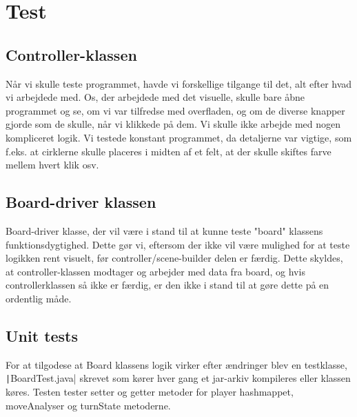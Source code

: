 \section{Test}
\subsection{Controller-klassen}\label{CKT}
Når vi skulle teste programmet, havde vi forskellige tilgange til det, alt efter hvad vi arbejdede med. Os, der arbejdede med det visuelle, skulle bare åbne programmet og se, om vi var tilfredse med overfladen, og om de diverse knapper gjorde som de skulle, når vi klikkede på dem. Vi skulle ikke arbejde med nogen kompliceret logik. Vi testede konstant programmet, da detaljerne var vigtige, som f.eks. at cirklerne skulle placeres i midten af et felt, at der skulle skiftes farve mellem hvert klik osv. 
\subsection{Board-driver klassen}\label{BDKT}
Board-driver klasse, der vil være i stand til at kunne teste "board" klassens funktionsdygtighed. Dette gør vi, eftersom der ikke vil være mulighed for at teste logikken rent visuelt, før controller/scene-builder delen er færdig. Dette skyldes, at controller-klassen modtager og arbejder med data fra board, og hvis controllerklassen så ikke er færdig, er den ikke i stand til at gøre dette på en ordentlig måde.
\subsection{Unit tests}\label{sec:unitTests}
For at tilgodese at Board klassens logik virker efter ændringer blev en testklasse, \texttt|BoardTest.java| skrevet som kører hver gang et jar-arkiv kompileres eller klassen køres. Testen tester setter og getter metoder for player hashmappet, moveAnalyser og turnState metoderne.